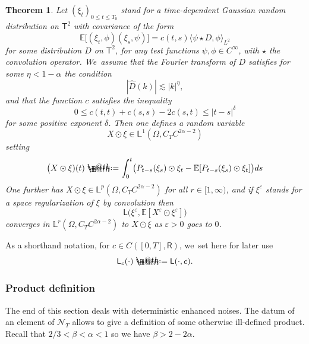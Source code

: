 \documentclass[JEP,XML,SOM,Unicode,published]{cedram}
\makeatletter
\newtheorem{thm}{Theorem}
\theoremstyle{definition}
\let\epsilon\varepsilon
\newcommand\bbE{\mathbb{E}}
\newcommand\bbR{\mathbf{\mathsf{R}}}
\newcommand{\mcN}{\mathcal{N}}
\newcommand{\bbL}{\mathbb{L}}
\newcommand*{\defeq}{\mathrel{\rlap{%
\raisebox{0.3ex}{$\m@th\cdot$}}%
\raisebox{-0.3ex}{$\m@th\cdot$}}%
=}
\makeatother
\begin{document}
\begin{thm} \label{ThmNoiseEnhancement}
Let $(\xi_t)_{0\leq t\leq T_0}$ stand for a time-dependent Gaussian random distribution on $\mathsf{T}^2$ with covariance of the form
\[
\bbE\bigl[(\xi_t,\phi)(\xi_s,\psi)\bigr] = c(t,s) \langle \psi\star D, \phi\rangle_{L^2}
\]
for some distribution $D$ on $\mathsf{T}^2$, for any test functions $\psi,\phi\in C^\infty$, with $\star$ the convolution operator. We~assume that the Fourier transform of $D$ satisfies for some $\eta< 1-\alpha$ the condition
\[
|\widehat{D}(k)| \lesssim |k|^\eta,
\]
and that the function $c$ satisfies the inequality
\[
0\leq c(t,t) + c(s,s) - 2c(s,t) \leq \vert t-s\vert^\delta
\]
for some positive exponent $\delta$. Then one defines a random variable
\[
X\odot \xi\in \bbL^1(\Omega, C_TC^{2\alpha-2})
\]
setting
\begin{equation} \label{EqDefnXOdotXi}
\bigl(X\odot\xi)(t) \defeq \int_0^t \bigl( P_{t-s}(\xi_s)\odot \xi_t - \bbE[P_{t-s}(\xi_s)\odot \xi_t]\bigr)ds
\end{equation}
One further has $X\odot \xi\in \bbL^p(\Omega, C_TC^{2\alpha-2})$ for all $r\in[1,\infty)$, and if $\xi^\epsilon$ stands for a space regularization of $\xi$ by convolution then
\[
\mathsf{L}\bigl(\xi^\epsilon, \bbE[X^\epsilon \odot \xi^\epsilon]\bigr)
\]
converges in $\bbL^r(\Omega, C_TC^{2\alpha-2})$ to $X\odot \xi$ as $\epsilon>0$ goes to $0$.
\end{thm}

As a shorthand notation, for $c\in C([0,T],\bbR)$, we~set here for later use
\begin{equation} \label{EqDefnLc}
\mathsf{L}_c(\cdot) \defeq \mathsf{L}(\cdot,c).
\end{equation}

\subsubsection{Product definition} The end of this section deals with deterministic enhanced noises. The datum of an element of ${{\boldsymbol{\mcN}}_T}$ allows to give a definition of some otherwise ill-defined product. Recall that $2/3<\beta<\alpha<1$ so we have $\beta>2-2\alpha$.
\end{document}
